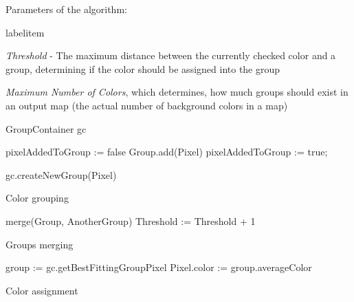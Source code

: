 \documentclass[a4paper,onecolumn,oneside,12pt]{memoir}
\makeatletter
\renewenvironment{itemize}{
  \begin{list}{  
  \csname labelitem\romannumeral\the\@listdepth\endcsname}{
  \setlength{\leftmargin}{1em}
	\setlength{\topsep}{6pt}%
	\setlength{\partopsep}{0pt}%
	\setlength{\parskip}{0pt}%
	\setlength{\parsep}{0pt}%
	\setlength{\itemsep}{0pt}}
}{
  \end{list}
}
\makeatother
\begin{document}
Parameters of the algorithm:
\begin{itemize}
  \item \textit{Threshold} - The maximum distance between the currently checked color and a group,
          determining if the color should be assigned into the group
  \item \textit{Maximum Number of Colors}, which determines, how much groups should exist in an
          output map (the actual number of background colors in a map)
\end{itemize}

\begin{algorithm}[!ht]

  GroupContainer gc\;
  {
    pixelAddedToGroup := false\;
    {
      {
        Group.add(Pixel)\;
        pixelAddedToGroup := true;
      }
    }

    {
      gc.createNewGroup(Pixel)\;
    }
  }


  \caption{Color grouping}
  \label{colorGroupingAlgorithm}
\end{algorithm}

\begin{algorithm}[!ht]

  {
    {
      {
        {
          merge(Group, AnotherGroup)\;
        }
      }
    }
    Threshold := Threshold + 1\;
  }


  \caption{Groups merging}
  \label{groupsMergingAlgorithm}
\end{algorithm}

\begin{algorithm}[!ht]

  {
    group := gc.getBestFittingGroup{Pixel}\;
    Pixel.color := group.averageColor\;
  }


  \caption{Color assignment}
  \label{colorAssignmentAlgorithm}
\end{algorithm}
\end{document}
